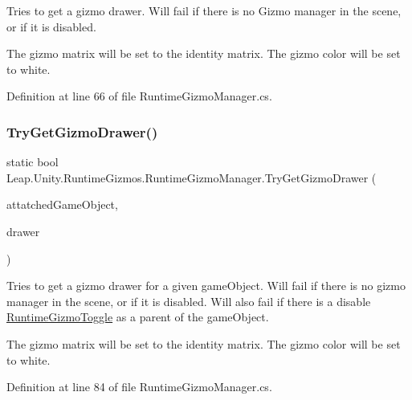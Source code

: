 Tries to get a gizmo drawer. Will fail if there is no Gizmo manager in the scene, or if it is disabled. 

The gizmo matrix will be set to the identity matrix. The gizmo color will be set to white. 

Definition at line 66 of file Runtime\+Gizmo\+Manager.\+cs.

\mbox{\label{class_leap_1_1_unity_1_1_runtime_gizmos_1_1_runtime_gizmo_manager_ae97fb1a40050e95d69d5cf7796ae3579}} 
\subsubsection{\texorpdfstring{TryGetGizmoDrawer()}{TryGetGizmoDrawer()}\hspace{0.1cm}{\footnotesize\ttfamily [2/2]}}
{\footnotesize\ttfamily static bool Leap.\+Unity.\+Runtime\+Gizmos.\+Runtime\+Gizmo\+Manager.\+Try\+Get\+Gizmo\+Drawer (\begin{DoxyParamCaption}\item[{Game\+Object}]{attatched\+Game\+Object,  }\item[{out \mbox{\hyperlink{class_leap_1_1_unity_1_1_runtime_gizmos_1_1_runtime_gizmo_drawer}{Runtime\+Gizmo\+Drawer}}}]{drawer }\end{DoxyParamCaption})\hspace{0.3cm}{\ttfamily [static]}}



Tries to get a gizmo drawer for a given game\+Object. Will fail if there is no gizmo manager in the scene, or if it is disabled. Will also fail if there is a disable \mbox{\hyperlink{class_leap_1_1_unity_1_1_runtime_gizmos_1_1_runtime_gizmo_toggle}{Runtime\+Gizmo\+Toggle}} as a parent of the game\+Object. 

The gizmo matrix will be set to the identity matrix. The gizmo color will be set to white. 

Definition at line 84 of file Runtime\+Gizmo\+Manager.\+cs.

\mbox{\label{class_leap_1_1_unity_1_1_runtime_gizmos_1_1_runtime_gizmo_manager_ad20940078be021e8ccc8a96d74c49984}} 
